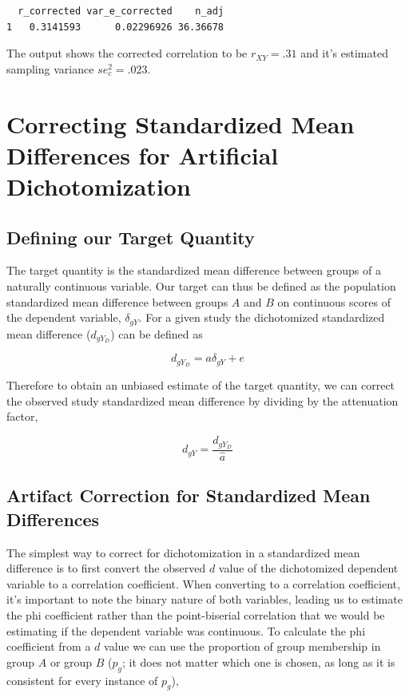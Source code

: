\documentclass[
  letterpaper,
  DIV=11,
  numbers=noendperiod]{scrreprt}
\begin{document}
\begin{verbatim}
  r_corrected var_e_corrected    n_adj
1   0.3141593      0.02296926 36.36678
\end{verbatim}

The output shows the corrected correlation to be \(r_{XY}=.31\) and it's
estimated sampling variance \(se_c^2=.023\).

\hypertarget{correcting-standardized-mean-differences-for-artificial-dichotomization}{%
\section{Correcting Standardized Mean Differences for Artificial
Dichotomization}\label{correcting-standardized-mean-differences-for-artificial-dichotomization}}

\hypertarget{defining-our-target-quantity-1}{%
\subsection{Defining our Target
Quantity}\label{defining-our-target-quantity-1}}

The target quantity is the standardized mean difference between groups
of a naturally continuous variable. Our target can thus be defined as
the population standardized mean difference between groups \(A\) and
\(B\) on continuous scores of the dependent variable, \(\delta_{gY}\).
For a given study the dichotomized standardized mean difference
(\(d_{gY_D}\)) can be defined as

\[
d_{gY_D} = a\delta_{gY} + e
\]

Therefore to obtain an unbiased estimate of the target quantity, we can
correct the observed study standardized mean difference by dividing by
the attenuation factor,

\[
d_{gY} = \frac{d_{gY_D}}{\hat{a}}
\]

\hypertarget{sec-corr-smd}{%
\subsection{Artifact Correction for Standardized Mean
Differences}\label{sec-corr-smd}}

The simplest way to correct for dichotomization in a standardized mean
difference is to first convert the observed \(d\) value of the
dichotomized dependent variable to a correlation coefficient. When
converting to a correlation coefficient, it's important to note the
binary nature of both variables, leading us to estimate the phi
coefficient rather than the point-biserial correlation that we would be
estimating if the dependent variable was continuous. To calculate the
phi coefficient from a \(d\) value we can use the proportion of group
membership in group \(A\) or group \(B\) (\(p_g\); it does not matter
which one is chosen, as long as it is consistent for every instance of
\(p_g\)),
\end{document}
